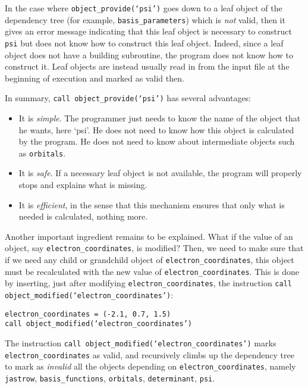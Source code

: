 \documentclass[a4paper,11pt]{article}
\begin{document}
In the case where {\tt object_provide(`psi')} goes down to a leaf object of the dependency tree (for example, {\tt basis_parameters}) which is {\it not} valid, then it gives an error message indicating that this leaf object is necessary to construct {\tt psi} but does not know how to construct this leaf object. Indeed, since a leaf object does not have a building subroutine, the program does not know how to construct it. Leaf objects are instead usually read in from the input file at the beginning of execution and marked as valid then.

\vspace{0.5cm}
In summary, {\tt call object_provide(`psi')} has several advantages:
\begin{itemize}
\item It is {\it simple}. The programmer just needs to know the name of the object that he wants, here `psi'. He does not need to know how this object is calculated by the program. He does not need to know about intermediate objects such as {\tt orbitals}.
\item It is {\it safe}. If a necessary leaf object is not available, the program will properly stops and explains what is missing.
\item It is {\it efficient}, in the sense that this mechanism ensures that only what is needed is calculated, nothing more.
\end{itemize}

Another important ingredient remains to be explained. What if the value of an object, say {\tt electron_coordinates}, is modified? Then, we need to make sure that if we need any child or grandchild object of {\tt electron_coordinates}, this object must be recalculated with the new value of {\tt electron_coordinates}. This is done by inserting, just after modifying {\tt electron_coordinates}, the instruction {\tt call object_modified(`electron_coordinates')}:

\vspace{0.5cm}
\noindent
{\tt electron_coordinates = (-2.1, 0.7, 1.5)\\
call object_modified(`electron_coordinates')
}

\vspace{0.5cm}
The instruction {\tt call object_modified(`electron_coordinates')} marks {\tt electron_coordinates} as valid, and recursively climbs up the dependency tree to mark as {\it invalid} all the objects depending on {\tt electron_coordinates}, namely {\tt jastrow},  {\tt basis_functions}, {\tt orbitals}, {\tt determinant}, {\tt psi}. 
\end{document}
